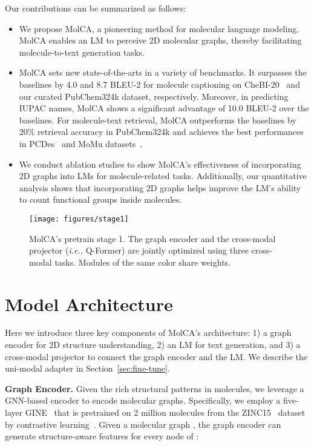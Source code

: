 \documentclass[11pt]{article}
\newcommand{\ie}{\emph{i.e., }}
\begin{document}
Our contributions can be summarized as follows:
\begin{itemize}[leftmargin=*]
 \item We propose MolCA, a pioneering method for molecular language modeling. MolCA enables an LM to perceive 2D molecular graphs, thereby facilitating molecule-to-text generation tasks.
 \item MolCA sets new state-of-the-arts in a variety of benchmarks. It surpasses the baselines by 4.0 and 8.7 BLEU-2 for molecule captioning on CheBI-20~\cite{MolT5} and our curated PubChem324k dataset, respectively. Moreover, in predicting IUPAC names, MolCA shows a significant advantage of 10.0 BLEU-2 over the baselines. For molecule-text retrieval, MolCA outperforms the baselines by 20\% retrieval accuracy in PubChem324k and achieves the best performances in PCDes~\cite{KVPLM} and MoMu datasets~\cite{MoMu}. 
 \item We conduct ablation studies to show MolCA's effectiveness of incorporating 2D graphs into LMs for molecule-related tasks. Additionally, our quantitative analysis shows that incorporating 2D graphs helps improve the LM's ability to count functional groups inside molecules. 
\end{itemize}


\begin{figure*}[t]
 \centering
 \texttt{[image: figures/stage1]}
 \caption{MolCA's pretrain stage 1. The graph encoder and the cross-modal projector (\ie Q-Former) are jointly optimized using three cross-modal tasks. Modules of the same color share weights.}
 \label{fig:stage1}
 \vspace{-10pt}
\end{figure*}

 \vspace{-3mm}
\section{Model Architecture}

\vspace{-2mm}
Here we introduce three key components of MolCA's architecture: 1) a graph encoder for 2D structure understanding, 2) an LM for text generation, and 3) a cross-modal projector to connect the graph encoder and the LM. We describe the uni-modal adapter in Section~\ref{sec:fine-tune}.



\textbf{Graph Encoder.} Given the rich structural patterns in molecules, we leverage a GNN-based encoder to encode molecular graphs. Specifically, we employ a five-layer GINE~\citep{pretrain_gnn} that is pretrained on 2 million molecules from the ZINC15~\citep{ZINC15} dataset by contrastive learning~\citep{GraphCL}. Given a molecular graph , the graph encoder  can generate structure-aware features for every node of : 
\end{document}
